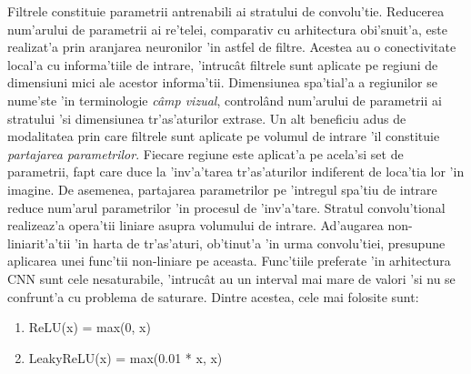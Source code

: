 \documentclass[12pt,a4paper,twoside]{report}
\begin{document}
Filtrele constituie parametrii antrenabili ai stratului de convolu'tie. Reducerea num'arului de parametrii ai re'telei, comparativ cu arhitectura obi'snuit'a, este realizat'a prin aranjarea neuronilor 'in astfel de filtre. Acestea au o conectivitate local'a cu informa'tiile de intrare, 'intruc\^at filtrele sunt aplicate pe regiuni de dimensiuni mici ale acestor informa'tii. Dimensiunea spa'tial'a a regiunilor se nume'ste 'in terminologie \textit{c\^amp vizual}, control\^and num'arului de parametrii ai stratului 'si dimensiunea tr'as'aturilor extrase. Un alt beneficiu adus de modalitatea prin care filtrele sunt aplicate pe volumul de intrare 'il constituie \textit{partajarea parametrilor}. Fiecare regiune este aplicat'a pe acela'si set de parametrii, fapt care duce la 'inv'a'tarea tr'as'aturilor indiferent de loca'tia lor 'in imagine. De asemenea, partajarea parametrilor pe 'intregul spa'tiu de intrare reduce num'arul parametrilor 'in procesul de 'inv'a'tare. Stratul convolu'tional realizeaz'a opera'tii liniare asupra volumului de intrare. Ad'augarea non-liniarit'a'tii 'in harta de tr'as'aturi, ob'tinut'a 'in urma convolu'tiei, presupune aplicarea unei func'tii non-liniare pe aceasta. Func'tiile preferate 'in arhitectura CNN sunt cele nesaturabile, 'intruc\^at au un interval mai mare de valori 'si nu se confrunt'a cu problema de saturare. Dintre acestea, cele mai folosite sunt:
\begin{enumerate}
\item ReLU(x) = max(0, x)
\item LeakyReLU(x) = max(0.01 * x, x)
\end{enumerate}
\end{document}
